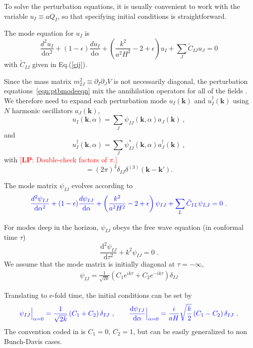 \documentclass[11pt]{article}
\newcommand{\ud}{\mathrm{d}}
\newcommand{\pd}{\partial}
\def\bk{{\mathbf{k}}}
\def\tilC{{\tilde C}}
\newcommand{\lp}[1]{\textcolor{red}{[{\bf LP}: #1]}}
\begin{document}
To solve the perturbation equations, it is usually convenient to work with the variable $u_I \equiv a Q_I$, so that specifying initial conditions is straightforward. 

The mode equation for $u_I$ is 
\begin{equation}
\frac{d^2 u_I}{\ud \alpha^2} + (1-\epsilon) \frac{d u_I}{\ud \alpha} + \left(\frac{k^2}{a^2H^2} - 2 + \epsilon \right) u_I + \sum_J \tilC_{IJ} u_J = 0
\label{eqn:ptbmodeeqn}
\end{equation}
with $\tilC_{IJ}$ given in Eq.(\ref{cij}).

Since the mass matrix $m^2_{IJ} \equiv \pd_I\pd_J V$ is not necessarily diagonal, the perturbation equations~\eqref{eqn:ptbmodeeqn} mix the annihilation operators for all of the fields \cite{Salopek:1988qh}. We therefore need to expand each perturbation mode $u_I(\bk)$ and $u_I^\dagger(\bk)$ using $N$ harmonic oscillators $a_J(\bk)$,
\begin{equation}
u_I(\bk, \alpha) = \sum_J \psi_{IJ}(\bk, \alpha) a_J(\bk) ~,
\end{equation}
and
\begin{equation}
u_I^\dagger(\bk, \alpha) = \sum_J \psi_{IJ}^*(\bk, \alpha) a_J^\dagger(\bk) ~,
\end{equation}
with \lp{Double-check factors of $\pi$.}
\begin{equation}
[ a_J(\bk), a^\dagger_I(\bk')] = (2\pi)^3 \delta_{IJ} \delta^{(3)}(\bk - \bk').
\end{equation}

The mode matrix $\psi_{IJ}$ evolves according to 
\begin{equation}
{\color{blue}
\frac{d^2 \psi_{IJ}}{\ud \alpha^2} + (1-\epsilon) \frac{d \psi_{IJ}}{\ud \alpha} + \left(\frac{k^2}{a^2H^2} - 2 + \epsilon \right) \psi_{IJ} + \sum_L \tilC_{IL} \psi_{LJ} = 0 ~. \label{mmeq} }
\end{equation}

For modes deep in the horizon, $\psi_{IJ}$ obeys the free wave equation (in conformal time $\tau$)
\begin{equation}
\frac{\ud^2 \psi_{IJ}}{\ud \tau^2} + k^2 \psi_{IJ} = 0 ~. 
\end{equation}
We assume that the mode matrix is initially diagonal at $\tau = -\infty$, 
\begin{eqnarray}
\psi_{IJ} = \frac{1}{\sqrt{2k}}\left( C_1 e^{ik\tau} + C_2 e^{-ik\tau} \right) \delta_{IJ}
\end{eqnarray}

Translating to e-fold time, the initial conditions can be set by
\begin{equation}
{\color{blue}
 \psi_{IJ}\Big|_{\alpha=0} = \frac{1}{\sqrt{2k}}\, (C_1 + C_2)\, \delta_{IJ} ~, 
\quad\quad 
\frac{\ud \psi_{IJ}}{\ud \alpha}\Big|_{\alpha=0} = \frac{i}{aH}\sqrt{\frac{k}{2}}\,(C_1 - C_2)\,\delta_{IJ} ~. }
\end{equation}
The convention coded in is $C_1 = 0$, $C_2 = 1$, but can be easily generalized to non Bunch-Davis cases.
\end{document}
